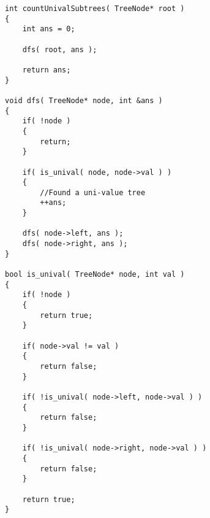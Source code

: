 \setcounter{lstlisting}{0}
\begin{lstlisting}[style=customc, caption={Recursive On Each NOde}]
int countUnivalSubtrees( TreeNode* root )
{
    int ans = 0;

    dfs( root, ans );

    return ans;
}

void dfs( TreeNode* node, int &ans )
{
    if( !node )
    {
        return;
    }

    if( is_unival( node, node->val ) )
    {
        //Found a uni-value tree
        ++ans;
    }

    dfs( node->left, ans );
    dfs( node->right, ans );
}

bool is_unival( TreeNode* node, int val )
{
    if( !node )
    {
        return true;
    }

    if( node->val != val )
    {
        return false;
    }

    if( !is_unival( node->left, node->val ) )
    {
        return false;
    }

    if( !is_unival( node->right, node->val ) )
    {
        return false;
    }

    return true;
}
\end{lstlisting}
